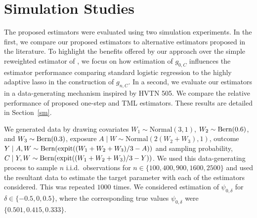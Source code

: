 \section{Simulation Studies}\label{sim}

The proposed estimators were evaluated using two simulation experiments. In the
first, we compare our proposed estimators to alternative estimators proposed in
the literature. To highlight the benefits offered by our approach over the
simple reweighted estimator of \citet{rose2011targeted2sd}, we focus on how
estimation of $g_{0,C}$ influences the estimator performance comparing standard
logistic regression to the highly adaptive lasso in the construction of
$g_{n,C}$. In a second, we evaluate our estimators in a data-generating
mechanism inspired by HVTN 505. We compare the relative performance of proposed
one-step and TML estimators. These results are detailed in
Section~\ref{sm}.


We generated data by drawing covariates $W_1 \sim \mbox{Normal}(3, 1)$, $W_2
\sim \operatorname{Bern}(0.6)$, and $W_3 \sim \operatorname{Bern}(0.3)$, exposure $A \mid W \sim
\mbox{Normal}(2(W_2 + W_3), 1)$, outcome $Y \mid A, W \sim \operatorname{Bern} (\operatorname{expit} ((W_1
+ W_2 + W_3)/3 - A ))$ and sampling probability, $C \mid Y, W \sim \operatorname{Bern}
(\operatorname{expit} ((W_1 + W_2 + W_3)/3 - Y) )$. We used this data-generating process to
sample $n$ i.i.d.~observations for $n \in \{100, 400, 900, 1600, 2500\}$ and
used the resultant data to estimate the target parameter with each of the
estimators considered. This was repeated $1000$ times. We considered estimation
of $\psi_{0, \delta}$ for $\delta \in \{-0.5, 0, 0.5\}$, where the corresponding
true values $\psi_{0, \delta}$ were $\{0.501, 0.415, 0.333\}$.

